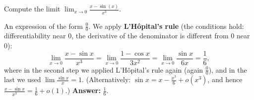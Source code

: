 
\begin{question}
Compute the limit $\displaystyle\lim_{x\to0}\frac{x-\sin(x)}{x^3}$.
\end{question}

\begin{solution}
An expression of the form $\frac00$. We apply \textbf{L'Hôpital's rule} (the conditions hold: differentiability near $0$, the derivative of the denominator is different from $0$ near $0$):
\[ \lim_{x\to0}\frac{x-\sin x}{x^3}=\lim_{x\to0}\frac{1-\cos x}{3x^2}=\lim_{x\to0}\frac{\sin x}{6x}=\frac16, \]
where in the second step we applied L'Hôpital's rule again (again $\frac00$), and in the last we used $\lim\frac{\sin x}{x}=1$.
(Alternatively: $\sin x=x-\frac{x^3}{6}+o(x^3)$, and hence $\frac{x-\sin x}{x^3}=\frac16+o(1)$.) \textbf{Answer:} $\frac16$.
\end{solution}
